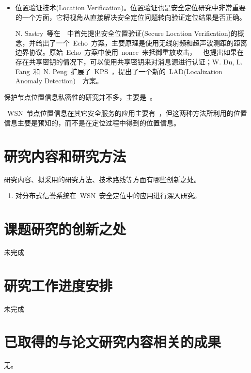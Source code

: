 \documentclass[a4paper,10pt]{article}
\begin{document}
\begin{itemize}
\item 位置验证技术(Location Verification)。位置验证也是安全定位研究中非常重要的一个方面，它将视角从直接解决安全定位问题转向验证定位结果是否正确。

N. Sastry~等在~\cite{Sastry2003}~中首先提出安全位置验证(Secure Location Verification)的概念，并给出了一个~Echo~方案，主要原理是使用无线射频和超声波测距的距离边界协议。原始~Echo~方案中使用~nonce~来抵御重放攻击，~\cite{Sastry2003}~也提出如果在存在共享密钥的情况下，可以使用共享密钥来对消息源进行认证；W. Du, L. Fang~和~N. Peng~扩展了~KPS~\cite{Fang2005}，提出了一个新的~LAD(Localization Anomaly Detection)~\cite{Du2006}~方案。
\cite{Capkun2008}\cite{Capkun2006a}\cite{Lazos2005a}

\end{itemize}

保护节点位置信息私密性的研究并不多，主要是~\cite{Ozturk2004, Gruteser2003}。

~WSN~节点位置信息在其它安全服务的应用主要有~\cite{Liu2003, Huang2004}，但这两种方法所利用的位置信息主要是预知的，而不是在定位过程中得到的位置信息。

\section{研究内容和研究方法} 

研究内容、拟采用的研究方法、技术路线等方面有哪些创新之处。

\begin{enumerate}

\item 对分布式信誉系统在~WSN~安全定位中的应用进行深入研究。

\end{enumerate}


\section{课题研究的创新之处}

未完成

\section{研究工作进度安排}

未完成

\section{已取得的与论文研究内容相关的成果} 

无。



\end{document}
